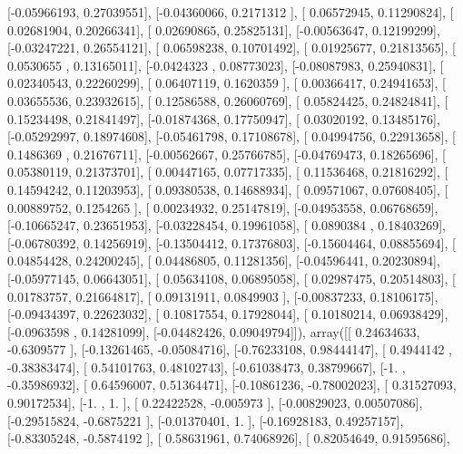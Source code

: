 \documentclass{article}
\begin{document}
       [-0.05966193,  0.27039551],
       [-0.04360066,  0.2171312 ],
       [ 0.06572945,  0.11290824],
       [ 0.02681904,  0.20266341],
       [ 0.02690865,  0.25825131],
       [-0.00563647,  0.12199299],
       [-0.03247221,  0.26554121],
       [ 0.06598238,  0.10701492],
       [ 0.01925677,  0.21813565],
       [ 0.0530655 ,  0.13165011],
       [-0.0424323 ,  0.08773023],
       [-0.08087983,  0.25940831],
       [ 0.02340543,  0.22260299],
       [ 0.06407119,  0.1620359 ],
       [ 0.00366417,  0.24941653],
       [ 0.03655536,  0.23932615],
       [ 0.12586588,  0.26060769],
       [ 0.05824425,  0.24824841],
       [ 0.15234498,  0.21841497],
       [-0.01874368,  0.17750947],
       [ 0.03020192,  0.13485176],
       [-0.05292997,  0.18974608],
       [-0.05461798,  0.17108678],
       [ 0.04994756,  0.22913658],
       [ 0.1486369 ,  0.21676711],
       [-0.00562667,  0.25766785],
       [-0.04769473,  0.18265696],
       [ 0.05380119,  0.21373701],
       [ 0.00447165,  0.07717335],
       [ 0.11536468,  0.21816292],
       [ 0.14594242,  0.11203953],
       [ 0.09380538,  0.14688934],
       [ 0.09571067,  0.07608405],
       [ 0.00889752,  0.1254265 ],
       [ 0.00234932,  0.25147819],
       [-0.04953558,  0.06768659],
       [-0.10665247,  0.23651953],
       [-0.03228454,  0.19961058],
       [ 0.0890384 ,  0.18403269],
       [-0.06780392,  0.14256919],
       [-0.13504412,  0.17376803],
       [-0.15604464,  0.08855694],
       [ 0.04854428,  0.24200245],
       [ 0.04486805,  0.11281356],
       [-0.04596441,  0.20230894],
       [-0.05977145,  0.06643051],
       [ 0.05634108,  0.06895058],
       [ 0.02987475,  0.20514803],
       [ 0.01783757,  0.21664817],
       [ 0.09131911,  0.0849903 ],
       [-0.00837233,  0.18106175],
       [-0.09434397,  0.22623032],
       [ 0.10817554,  0.17928044],
       [ 0.10180214,  0.06938429],
       [-0.0963598 ,  0.14281099],
       [-0.04482426,  0.09049794]]), array([[ 0.24634633, -0.6309577 ],
       [-0.13261465, -0.05084716],
       [-0.76233108,  0.98444147],
       [ 0.4944142 , -0.38383474],
       [ 0.54101763,  0.48102743],
       [-0.61038473,  0.38799667],
       [-1.        , -0.35986932],
       [ 0.64596007,  0.51364471],
       [-0.10861236, -0.78002023],
       [ 0.31527093,  0.90172534],
       [-1.        ,  1.        ],
       [ 0.22422528, -0.005973  ],
       [-0.00829023,  0.00507086],
       [-0.29515824, -0.6875221 ],
       [-0.01370401,  1.        ],
       [-0.16928183,  0.49257157],
       [-0.83305248, -0.5874192 ],
       [ 0.58631961,  0.74068926],
       [ 0.82054649,  0.91595686],
\end{document}
